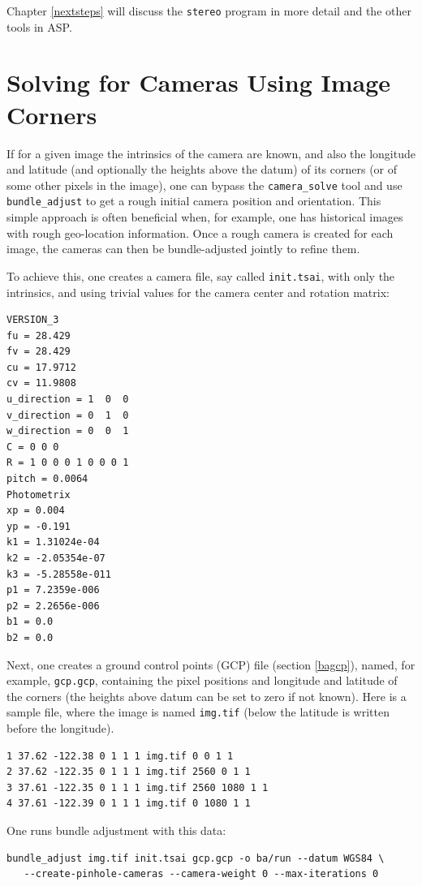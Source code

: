Chapter \ref{nextsteps} will discuss the \texttt{stereo} program in more
detail and the other tools in ASP.

\section{Solving for Cameras Using Image Corners}
\label{imagecorners}

If for a given image the intrinsics of the camera are known, and also
the longitude and latitude (and optionally the heights above the datum)
of its corners (or of some other pixels in the image), one can bypass
the \texttt{camera\_solve} tool and use \texttt{bundle\_adjust} to get a
rough initial camera position and orientation. This simple approach is
often beneficial when, for example, one has historical images with rough
geo-location information.  Once a rough camera is created for each image,
the cameras can then be bundle-adjusted jointly to refine them.

To achieve this, one creates a camera file, say called \texttt{init.tsai}, with only
the intrinsics, and using trivial values for the camera center and
rotation matrix:
\begin{verbatim}
VERSION_3
fu = 28.429
fv = 28.429
cu = 17.9712
cv = 11.9808
u_direction = 1  0  0
v_direction = 0  1  0
w_direction = 0  0  1
C = 0 0 0
R = 1 0 0 0 1 0 0 0 1
pitch = 0.0064
Photometrix
xp = 0.004
yp = -0.191
k1 = 1.31024e-04
k2 = -2.05354e-07
k3 = -5.28558e-011
p1 = 7.2359e-006
p2 = 2.2656e-006
b1 = 0.0
b2 = 0.0
\end{verbatim}

Next, one creates a ground control points (GCP) file (section
\ref{bagcp}), named, for example, \texttt{gcp.gcp}, containing the pixel
positions and longitude and latitude of the corners (the heights above
datum can be set to zero if not known). Here is a sample file, where the
image is named \texttt{img.tif} (below the latitude is written before
the longitude).

\begin{verbatim}
1 37.62 -122.38 0 1 1 1 img.tif 0 0 1 1 
2 37.62 -122.35 0 1 1 1 img.tif 2560 0 1 1 
3 37.61 -122.35 0 1 1 1 img.tif 2560 1080 1 1 
4 37.61 -122.39 0 1 1 1 img.tif 0 1080 1 1 
\end{verbatim}

One runs bundle adjustment with this data:
\begin{verbatim}
bundle_adjust img.tif init.tsai gcp.gcp -o ba/run --datum WGS84 \
   --create-pinhole-cameras --camera-weight 0 --max-iterations 0
\end{verbatim}

